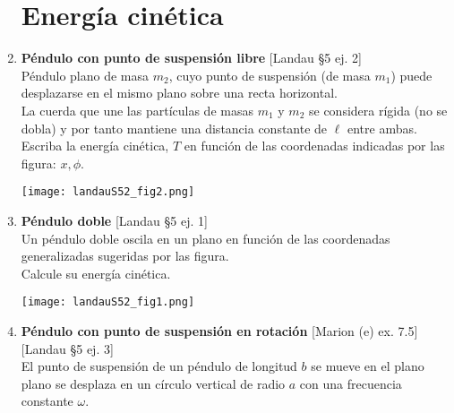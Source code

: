 \documentclass[11pt, spanish, a4paper, twoside]{article}
\begin{document}
\begin{enumerate}
	\section*{Energía cinética}

		\item
		\begin{minipage}[t][4cm]{0.6\textwidth}
			\textbf{Péndulo con punto de suspensión libre} [Landau \S5 ej. 2]\\
			Péndulo plano de masa \(m_2\), cuyo punto de suspensión (de masa \(m_1\)) puede desplazarse en el mismo plano sobre una recta horizontal.\\
			La cuerda que une las partículas de masas \(m_1\) y \(m_2\) se considera rígida (no se dobla) y por tanto mantiene una distancia constante de \(\ell\) entre ambas.\\
			Escriba la energía cinética, \(T\) en función de las coordenadas indicadas por las figura: \(x, \phi\).
		\end{minipage}
		\begin{minipage}[c][1cm][t]{0.35\textwidth}
			\texttt{[image: landauS52\_fig2.png]}
		\end{minipage}


		\item
			\begin{minipage}[t][4cm]{0.7\textwidth}
				\textbf{Péndulo doble} [Landau \S5 ej. 1]\\
				Un péndulo doble oscila en un plano en función de las coordenadas generalizadas sugeridas por las figura.\\
				Calcule su energía cinética.\\
			\end{minipage}
			\begin{minipage}[c][0.5cm][t]{0.3\textwidth}
				\texttt{[image: landauS52\_fig1.png]}
			\end{minipage}


		\item
			\begin{minipage}[t][7cm]{0.55\textwidth}
				\textbf{Péndulo con punto de suspensión en rotación} [Marion (e) ex. 7.5] [Landau \S5 ej. 3]\\
				El punto de suspensión de un péndulo de longitud \(b\) se mueve en el plano plano se desplaza en un círculo vertical de radio \(a\) con una frecuencia constante \(\omega\).


\end{minipage}
\end{enumerate}
\end{document}
